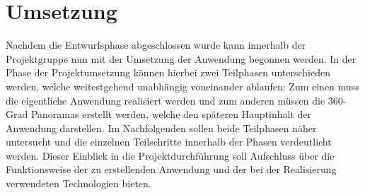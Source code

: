 \section{Umsetzung}
\label{sec:Umsetzung}

Nachdem die Entwurfsphase abgeschlossen wurde kann innerhalb der Projektgruppe
nun mit der Umsetzung der Anwendung begonnen werden. In der Phase der
Projektumsetzung können hierbei zwei Teilphasen unterschieden werden, welche
weitestgehend unabhängig voneinander ablaufen: Zum einen muss die eigentliche
Anwendung realisiert werden und zum anderen müssen die 360-Grad Panoramas
erstellt werden, welche den späteren Hauptinhalt der Anwendung darstellen.
Im Nachfolgenden sollen beide Teilphasen näher untersucht und die einzelnen
Teilschritte innerhalb der Phasen verdeutlicht werden. Dieser Einblick in die
Projektdurchführung soll Aufschluss über die Funktionsweise der zu erstellenden
Anwendung und der bei der Realisierung verwendeten Technologien bieten.



